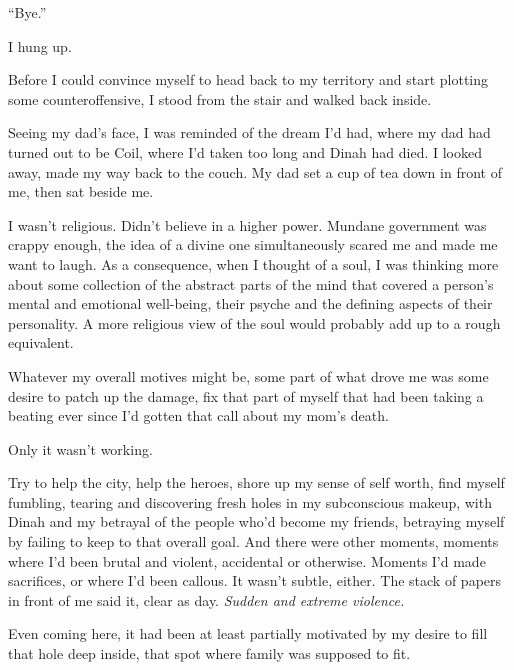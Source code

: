 ``Bye.''



I hung up.



Before I could convince myself to head back to my territory and start plotting some counteroffensive, I stood from the stair and walked back inside.



Seeing my dad's face, I was reminded of the dream I'd had, where my dad had turned out to be Coil, where I'd taken too long and Dinah had died.  I looked away, made my way back to the couch.  My dad set a cup of tea down in front of me, then sat beside me.



I wasn't religious.  Didn't believe in a higher power.  Mundane government was crappy enough, the idea of a divine one simultaneously scared me and made me want to laugh.  As a consequence, when I thought of a soul, I was thinking more about some collection of the abstract parts of the mind that covered a person's mental and emotional well-being, their psyche and the defining aspects of their personality.  A more religious view of the soul would probably add up to a rough equivalent.



Whatever my overall motives might be, some part of what drove me was some desire to patch up the damage, fix that part of myself that had been taking a beating ever since I'd gotten that call about my mom's death.



Only it wasn't working.



Try to help the city, help the heroes, shore up my sense of self worth, find myself fumbling, tearing and discovering fresh holes in my subconscious makeup, with Dinah and my betrayal of the people who'd become my friends, betraying myself by failing to keep to that overall goal.  And there were other moments, moments where I'd been brutal and violent, accidental or otherwise.  Moments I'd made sacrifices, or where I'd been callous.  It wasn't subtle, either.  The stack of papers in front of me said it, clear as day.  \emph{Sudden and extreme violence.}



Even coming here, it had been at least partially motivated by my desire to fill that hole deep inside, that spot where family was supposed to fit.



